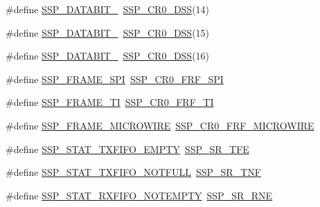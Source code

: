 \begin{DoxyCompactItemize}
\item 
\#define \hyperlink{group___s_s_p___public___macros_ga23092c43aa47e79b5c540e1c8bcfb43f}{S\+S\+P\+\_\+\+D\+A\+T\+A\+B\+I\+T\+\_}~\hyperlink{group___s_s_p___private___macros_gac08fdfb1d7152206ec8a46ae361ceee3}{S\+S\+P\+\_\+\+C\+R0\+\_\+\+D\+SS}(14)
\item 
\#define \hyperlink{group___s_s_p___public___macros_gafb96efb2ad42b6804003beb416bf513f}{S\+S\+P\+\_\+\+D\+A\+T\+A\+B\+I\+T\+\_}~\hyperlink{group___s_s_p___private___macros_gac08fdfb1d7152206ec8a46ae361ceee3}{S\+S\+P\+\_\+\+C\+R0\+\_\+\+D\+SS}(15)
\item 
\#define \hyperlink{group___s_s_p___public___macros_ga8a5285b118c9dc1a7f2ce6c4caa3b962}{S\+S\+P\+\_\+\+D\+A\+T\+A\+B\+I\+T\+\_}~\hyperlink{group___s_s_p___private___macros_gac08fdfb1d7152206ec8a46ae361ceee3}{S\+S\+P\+\_\+\+C\+R0\+\_\+\+D\+SS}(16)
\item 
\#define \hyperlink{group___s_s_p___public___macros_gae60b1441f3ecdb03755304c320d89337}{S\+S\+P\+\_\+\+F\+R\+A\+M\+E\+\_\+\+S\+PI}~\hyperlink{group___s_s_p___private___macros_ga4f0f58a8f4b87af0f18e84b981c31a74}{S\+S\+P\+\_\+\+C\+R0\+\_\+\+F\+R\+F\+\_\+\+S\+PI}
\item 
\#define \hyperlink{group___s_s_p___public___macros_gacc8028fc65d645b5c0ac06863bc8cd9c}{S\+S\+P\+\_\+\+F\+R\+A\+M\+E\+\_\+\+TI}~\hyperlink{group___s_s_p___private___macros_ga54c718a1a75a1e5e06417b9f8267ee27}{S\+S\+P\+\_\+\+C\+R0\+\_\+\+F\+R\+F\+\_\+\+TI}
\item 
\#define \hyperlink{group___s_s_p___public___macros_gab908ae3d749411618396107e2e0c635e}{S\+S\+P\+\_\+\+F\+R\+A\+M\+E\+\_\+\+M\+I\+C\+R\+O\+W\+I\+RE}~\hyperlink{group___s_s_p___private___macros_ga7ca858fcf0f529a38e1e1bf0a69d4486}{S\+S\+P\+\_\+\+C\+R0\+\_\+\+F\+R\+F\+\_\+\+M\+I\+C\+R\+O\+W\+I\+RE}
\item 
\#define \hyperlink{group___s_s_p___public___macros_gadb3e00bb8249856e4ace28ea931bb177}{S\+S\+P\+\_\+\+S\+T\+A\+T\+\_\+\+T\+X\+F\+I\+F\+O\+\_\+\+E\+M\+P\+TY}~\hyperlink{group___s_s_p___private___macros_gaa56cadbf2604cf3d9706f3583be99f63}{S\+S\+P\+\_\+\+S\+R\+\_\+\+T\+FE}
\item 
\#define \hyperlink{group___s_s_p___public___macros_ga9a88c97aaba7a01be0842d099cf7958c}{S\+S\+P\+\_\+\+S\+T\+A\+T\+\_\+\+T\+X\+F\+I\+F\+O\+\_\+\+N\+O\+T\+F\+U\+LL}~\hyperlink{group___s_s_p___private___macros_gabde0199183f2a747cd039c66d40cf534}{S\+S\+P\+\_\+\+S\+R\+\_\+\+T\+NF}
\item 
\#define \hyperlink{group___s_s_p___public___macros_ga3b0ac9bf74e9d93e0a60a225ada68504}{S\+S\+P\+\_\+\+S\+T\+A\+T\+\_\+\+R\+X\+F\+I\+F\+O\+\_\+\+N\+O\+T\+E\+M\+P\+TY}~\hyperlink{group___s_s_p___private___macros_ga67740be98d73a50bf341ca3e2c25da6e}{S\+S\+P\+\_\+\+S\+R\+\_\+\+R\+NE}

\end{DoxyCompactItemize}
